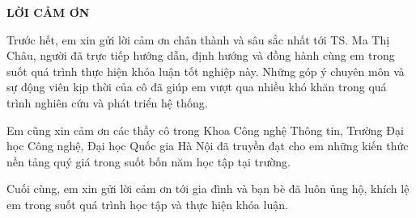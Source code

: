 \documentclass[../DoAn.tex]{subfiles}
\begin{document}
\begin{center}
    \Large{\textbf{LỜI CẢM ƠN}}\\
\end{center}
\vspace{1cm}
Trước hết, em xin gửi lời cảm ơn chân thành và sâu sắc nhất tới TS. Ma Thị Châu, người đã trực tiếp hướng dẫn, định hướng và đồng hành cùng em trong suốt quá trình thực hiện khóa luận tốt nghiệp này. Những góp ý chuyên môn và sự động viên kịp thời của cô đã giúp em vượt qua nhiều khó khăn trong quá trình nghiên cứu và phát triển hệ thống.

Em cũng xin cảm ơn các thầy cô trong Khoa Công nghệ Thông tin, Trường Đại học Công nghệ, Đại học Quốc gia Hà Nội đã truyền đạt cho em những kiến thức nền tảng quý giá trong suốt bốn năm học tập tại trường.

Cuối cùng, em xin gửi lời cảm ơn tới gia đình và bạn bè đã luôn ủng hộ, khích lệ em trong suốt quá trình học tập và thực hiện khóa luận.
\end{document}
